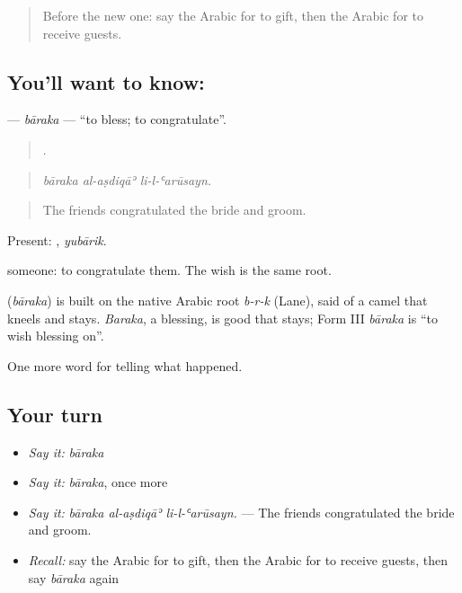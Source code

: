 \label{lesson:AR-C336-baraka}



\begin{quote}
Before the new one: say the Arabic for to gift, then the Arabic for to receive guests.
\end{quote}

\subsection*{You'll want to know: }
\textbf{} — \emph{bāraka} — \textquotedblleft{}to bless; to congratulate\textquotedblright{}.

\begin{quote}
  .
\end{quote}

\begin{quote}
\emph{bāraka al-aṣdiqāʾ li-l-ʿarūsayn.}
\end{quote}

\begin{quote}
The friends congratulated the bride and groom.
\end{quote}

Present: , \emph{yubārik}.

  someone: to congratulate them. The wish  is the same root.

\begin{cousinweb}
\textbf{} (\emph{bāraka}) is built on the native Arabic root \emph{b-r-k} (Lane), said of a camel that kneels and stays. \emph{Baraka}, a blessing, is good that stays; Form III \emph{bāraka} is \textquotedblleft{}to wish blessing on\textquotedblright{}.
\end{cousinweb}

\begin{grammarlens}[title={What you've built}]
One more word for telling what happened.
\end{grammarlens}

\subsection*{Your turn}
\begin{itemize}
\raggedright
  \item \emph{Say it:} \emph{bāraka}
  \item \emph{Say it:} \emph{bāraka}, once more
  \item \emph{Say it:} \emph{bāraka al-aṣdiqāʾ li-l-ʿarūsayn.} — The friends congratulated the bride and groom.
  \item \emph{Recall:} say the Arabic for to gift, then the Arabic for to receive guests, then say \emph{bāraka} again
\end{itemize}

